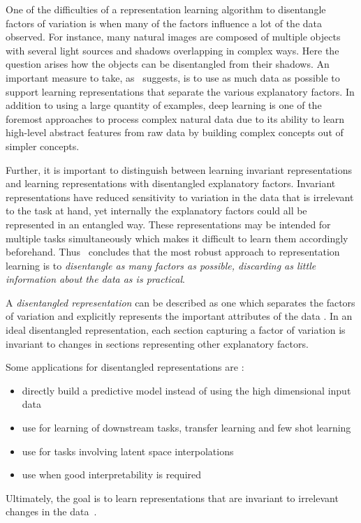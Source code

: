 \documentclass[a4paper,12pt]{report}
\begin{document}
One of the difficulties of a representation learning algorithm to disentangle factors of variation is when many of the factors influence a lot of the data observed. For instance, many natural images are composed of multiple objects with several light sources and shadows overlapping in complex ways. Here the question arises how the objects can be disentangled from their shadows. An important measure to take, as~\cite{ReprLearning} suggests, is to use as much data as possible to support learning representations that separate the various explanatory factors. In addition to using a large quantity of examples, deep learning is one of the foremost approaches to process complex natural data due to its ability to learn high-level abstract features from raw data by building complex concepts out of simpler concepts. 

Further, it is important to distinguish between learning invariant representations and learning representations with disentangled explanatory factors. Invariant representations have reduced sensitivity to variation in the data that is irrelevant to the task at hand, yet internally the explanatory factors could all be represented in an entangled way. These representations may be intended for multiple tasks simultaneously which makes it difficult to learn them accordingly beforehand. Thus~\cite{ReprLearning} concludes that the most robust approach to representation learning is to \textit{disentangle as many factors as possible, discarding as little information about the data as is practical}.

A \textit{disentangled representation} can be described as one which separates the factors of variation and explicitly represents the important attributes of the data \cite{Framework4QuantEvalDisRepr}. In an ideal disentangled representation, each section capturing a factor of variation is invariant to changes in sections representing other explanatory factors.

Some applications for disentangled representations are \cite{ChallengeAssLofDisRepr}:
\begin{itemize}
  \item directly build a predictive model instead of using the high dimensional input data
  \item use for learning of downstream tasks, transfer learning and few shot learning
  \item use for tasks involving latent space interpolations
  \item use when good interpretability is required
\end{itemize}
Ultimately, the goal is to learn representations that are invariant to irrelevant changes in the data~\cite{FwkQuantEvalDisRep}.
\end{document}
